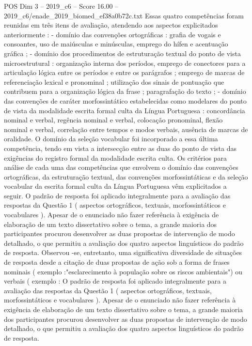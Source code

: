 \begin{textsample}{POS Dim 3 – 2019\_c6 – Score 16.00 – 2019\_c6/enade\_2019\_biomed\_ef38a0b72c.txt}
Essas quatro competências foram reunidas em três itens de avaliação, atendendo aos aspectos explicitados anteriormente : - domínio das convenções ortográficas : grafia de vogais e consoantes, uso de maiúsculas e minúsculas, emprego do hífen e acentuação gráfica ; - domínio dos procedimentos de estruturação textual do ponto de vista microestrutural : organização interna dos períodos, emprego de conectores para a articulação lógica entre os períodos e entre os parágrafos ; emprego de marcas de referenciação lexical e pronominal ; utilização dos sinais de pontuação que contribuem para a organização lógica da frase ; paragrafação do texto ; - domínio das convenções de caráter morfossintático estabelecidas como modelares do ponto de vista da modalidade escrita formal culta da Língua Portuguesa : concordância nominal e verbal, regência nominal e verbal, colocação pronominal, flexão nominal e verbal, correlação entre tempos e modos verbais, ausência de marcas de oralidade.
O domínio da seleção vocabular foi incorporado a essa última competência, tendo em vista a intersecção entre as duas do ponto de vista das exigências do registro formal da modalidade escrita culta.
Os critérios para análise de cada uma das competências que envolvem o domínio das convenções ortográficas, da estruturação textual, das convenções morfossintáticas e da seleção vocabular da escrita formal culta da Língua Portuguesa vêm explicitados a seguir.
O padrão de resposta foi aplicado integralmente para a avaliação das respostas da Questão 1 ( aspectos ortográficos, textuais, morfossintáticos e vocabulares ).
Apesar de o enunciado não fazer referência à exigência de elaboração de um texto dissertativo sobre o tema, a grande maioria dos participantes procurou desenvolver as duas propostas de intervenção de modo detalhado, o que permitiu a avaliação dos quatro aspectos linguísticos do padrão de resposta.
Observou -se, entretanto, uma significativa diversidade de situações de resposta desde a citação de duas propostas de ação sob a forma de frases nominais ( exemplo :"esclarecimento à população sobre os riscos ambientais") ou verbais ( exemplo : O padrão de resposta foi aplicado integralmente para a avaliação das respostas da Questão 1 ( aspectos ortográficos, textuais, morfossintáticos e vocabulares ).
Apesar de o enunciado não fazer referência à exigência de elaboração de um texto dissertativo sobre o tema, a grande maioria dos participantes procurou desenvolver as duas propostas de intervenção de modo detalhado, o que permitiu a avaliação dos quatro aspectos linguísticos do padrão de resposta.

\end{textsample}
